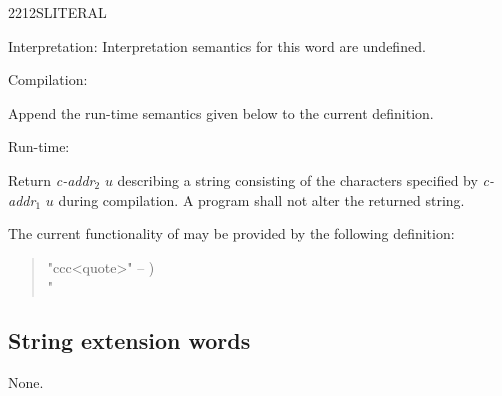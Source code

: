 \begin{newword*}{2212}{SLITERAL}
\item[Interpretation:]
	Interpretation semantics for this word are undefined.

\item[Compilation:]

	Append the run-time semantics given below to the current
	definition.

\item[Run-time:]

	Return \emph{c-addr}$_2$ $u$ describing a string consisting of
	the characters specified by \emph{c-addr}$_1$ $u$ during
	compilation. A program shall not alter the returned string.

	\begin{rationale}
		The current functionality of  may be
		provided by the following definition:
		\begin{quote}\ttfamily
			\word{:}   "ccc<quote>" -- ) \\
			\tab \word{[CHAR]} "  ~
				  \\
			\word{;} 
		\end{quote}
	\end{rationale}

\end{newword*}


\subsection{String extension words} %

None.
